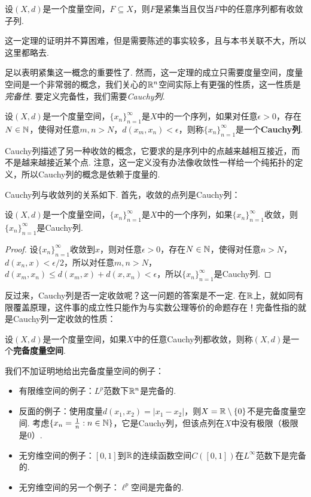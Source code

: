 \begin{theorem}\label{theorem:compact-converge}
    设$(X,d)$是一个度量空间，$F\subseteq X$，则$F$是紧集当且仅当$F$中的任意序列都有收敛子列. 
\end{theorem}

这一定理的证明并不算困难，但是需要陈述的事实较多，且与本书关联不大，所以这里都略去. 

 足以表明紧集这一概念的重要性了. 然而，这一定理的成立只需要度量空间，度量空间是一个非常弱的概念，我们关心的$\mathbb{R}^n$空间实际上有更强的性质，这一性质是\textit{完备性}. 要定义完备性，我们需要\textit{Cauchy列}. 

\begin{definition}[Cauchy列]
    设$(X,d)$是一个度量空间，$\{x_n\}_{n=1}^\infty$是$X$中的一个序列，如果对任意$\epsilon>0$，存在$N\in\mathbb{N}$，使得对任意$m,n>N$，$d(x_m,x_n)<\epsilon$，则称$\{x_n\}_{n=1}^\infty$是一个\textbf{Cauchy列}. 
\end{definition}

Cauchy列描述了另一种收敛的概念，它要求的是序列中的点越来越相互接近，而不是越来越接近某个点. 注意，这一定义没有办法像收敛性一样给一个纯拓扑的定义，所以Cauchy列的概念是依赖于度量的. 

Cauchy列与收敛列的关系如下. 首先，收敛的点列是Cauchy列：

\begin{proposition}\label{proposition:cauchy-converge}
    设$(X,d)$是一个度量空间，$\{x_n\}_{n=1}^\infty$是$X$中的一个序列，如果$\{x_n\}_{n=1}^\infty$收敛，则$\{x_n\}_{n=1}^\infty$是Cauchy列. 
\end{proposition}
\begin{proof}
    设$\{x_n\}_{n=1}^\infty$收敛到$x$，则对任意$\epsilon>0$，存在$N\in\mathbb{N}$，使得对任意$n>N$，$d(x_n,x)<\epsilon/2$，所以对任意$m,n>N$，$d(x_m,x_n)\leq d(x_m,x)+d(x,x_n)<\epsilon$，所以$\{x_n\}_{n=1}^\infty$是Cauchy列. 
\end{proof}

反过来，Cauchy列是否一定收敛呢？这一问题的答案是不一定. 在$\mathbb{R}$上，就如同有限覆盖原理，这件事的成立性只能作为与实数公理等价的命题存在！完备性指的就是Cauchy列一定收敛的性质：

\begin{definition}[完备度量空间]
    设$(X,d)$是一个度量空间，如果$X$中的任意Cauchy列都收敛，则称$(X,d)$是一个\textbf{完备度量空间}. 
\end{definition}
我们不加证明地给出完备度量空间的例子：
\begin{example}
\begin{itemize}
\item 有限维空间的例子：$L^p$范数下$\mathbb{R}^n$是完备的.
\item 反面的例子：使用度量$d(x_1,x_2)=|x_1-x_2|$，则$X=\mathbb{R}\setminus\{0\}$不是完备度量空间. 考虑$\{x_n=\frac1n:n\in\mathbb{N}\}$，它是Cauchy列，但该点列在$X$中没有极限（极限是$0$）.
\item 无穷维空间的例子：$[0,1]$到$\mathbb{R}$的连续函数空间$C([0,1])$在$L^\infty$范数下是完备的.
\item 无穷维空间的另一个例子：$\ell^p$空间是完备的. 
\end{itemize}
\end{example}

